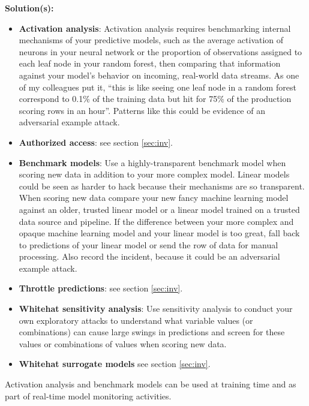 \documentclass[fleqn]{article}
\begin{document}
\noindent\textbf{Solution(s):} 
\begin{itemize}

\item \textbf{Activation analysis}: Activation analysis requires benchmarking internal mechanisms of your predictive models, such as the average activation of neurons in your neural network or the proportion of observations assigned to each leaf node in your random forest, then comparing that information against your model's behavior on incoming, real-world data streams. As one of my colleagues put it, ``this is like seeing one leaf node in a random forest correspond to 0.1\% of the training data but hit for 75\% of the production scoring rows in an hour''. Patterns like this could be evidence of an adversarial example attack.

\item \textbf{Authorized access}: see section \ref{sec:inv}.

\item \textbf{Benchmark models}: Use a highly-transparent benchmark model when scoring new data in addition to your more complex model. Linear models could be seen as harder to hack because their mechanisms are so transparent. When scoring new data compare your new fancy machine learning model against an older, trusted linear model or a linear model trained on a trusted data source and pipeline. If the difference between your more complex and opaque machine learning model and your linear model is too great, fall back to predictions of your linear model or send the row of data for manual processing. Also record the incident, because it could be an adversarial example attack.

\item \textbf{Throttle predictions}: see section \ref{sec:inv}.

\item \textbf{Whitehat sensitivity analysis}: Use sensitivity analysis to conduct your own exploratory attacks to understand what variable values (or combinations) can cause large swings in predictions and screen for these values or combinations of values when scoring new data.

\item \textbf{Whitehat surrogate models} see section \ref{sec:inv}.\\

\end{itemize}

\noindent Activation analysis and benchmark models can be used at training time and as part of real-time model monitoring activities.
\end{document}
